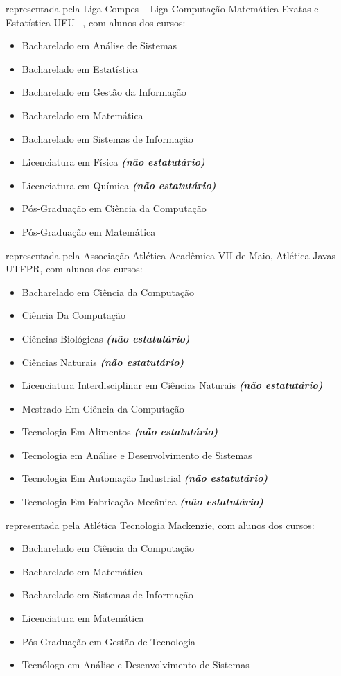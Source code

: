 \begin{article}
\begin{description}[noitemsep]
		\item[UFU] representada pela Liga Compes -- Liga Computação Matemática Exatas e Estatística UFU --, com alunos dos cursos:
		\begin{itemize}[noitemsep]
			\item Bacharelado em Análise de Sistemas
			\item Bacharelado em Estatística
			\item Bacharelado em Gestão da Informação
			\item Bacharelado em Matemática
			\item Bacharelado em Sistemas de Informação
			\item Licenciatura em Física \textbf{\textit{(não estatutário)}}
			\item Licenciatura em Química \textbf{\textit{(não estatutário)}}
			\item Pós-Graduação em Ciência da Computação
			\item Pós-Graduação em Matemática
		\end{itemize}

		\item[UTFPR] representada pela Associação Atlética Acadêmica VII de Maio, Atlética Javas UTFPR, com alunos dos cursos:
		\begin{itemize}[noitemsep]
			\item Bacharelado em Ciência da Computação
			\item Ciência Da Computação
			\item Ciências Biológicas \textbf{\textit{(não estatutário)}}
			\item Ciências Naturais \textbf{\textit{(não estatutário)}}
			\item Licenciatura Interdisciplinar em Ciências Naturais \textbf{\textit{(não estatutário)}}
			\item Mestrado Em Ciência da Computação
			\item Tecnologia Em Alimentos \textbf{\textit{(não estatutário)}}
			\item Tecnologia em Análise e Desenvolvimento de Sistemas
			\item Tecnologia Em Automação Industrial \textbf{\textit{(não estatutário)}}
			\item Tecnologia Em Fabricação Mecânica \textbf{\textit{(não estatutário)}}
		\end{itemize}

		\item[Universidade Presbiteriana Mackenzie] representada pela Atlética Tecnologia Mackenzie, com alunos dos cursos:
		\begin{itemize}[noitemsep]
			\item Bacharelado em Ciência da Computação
			\item Bacharelado em Matemática
			\item Bacharelado em Sistemas de Informação
			\item Licenciatura em Matemática
			\item Pós-Graduação em Gestão de Tecnologia
			\item Tecnólogo em Análise e Desenvolvimento de Sistemas
		\end{itemize}


\end{description}
\end{article}
